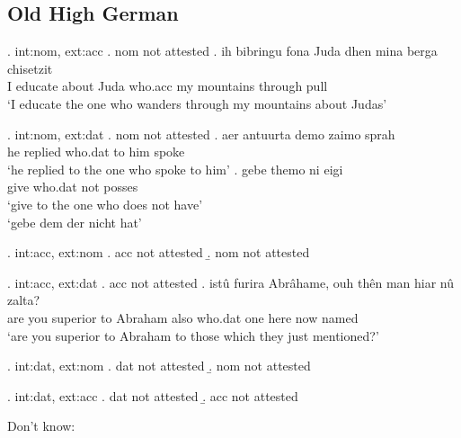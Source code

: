 \subsection{Old High German}


\ex. \ac{int}:\ac{nom}, \ac{ext}:\ac{acc}
\a. \ac{nom} not attested
\bg. ih bibringu fona Juda dhen mina berga chisetzit\\
 I educate\scsub{[acc]} about Juda who.\ac{acc} my mountains {through pull}\scsub{[nom]}\\
 `I educate the one who wanders through my mountains about Judas' 

\ex. \ac{int}:\ac{nom}, \ac{ext}:\ac{dat}
\a. \ac{nom} not attested
\bg. aer antuurta demo zaimo sprah\\
 he replied\scsub{[dat]} who.\ac{dat} {to him} spoke\scsub{[nom]}\\
 `he replied to the one who spoke to him' 
\bg. gebe themo ni eigi\\
 give\scsub{[dat]} who.\ac{dat} not posses\scsub{[nom]}\\
 `give to the one who does not have' \\
 `gebe dem der nicht hat' 

\ex. \ac{int}:\ac{acc}, \ac{ext}:\ac{nom}
\a. \ac{acc} not attested
\b. \ac{nom} not attested

\ex. \ac{int}:\ac{acc}, \ac{ext}:\ac{dat}
\a. \ac{acc} not attested
\bg. istû furira Abrâhame, ouh thên man hiar nû zalta?\\
 {are you} superior\scsub{[dat]} {to Abraham} also who.\ac{dat} one here now named\scsub{[acc]}\\
 `are you superior to Abraham to those which they just mentioned?' 

\ex. \ac{int}:\ac{dat}, \ac{ext}:\ac{nom}
\a. \ac{dat} not attested
\b. \ac{nom} not attested

\ex. \ac{int}:\ac{dat}, \ac{ext}:\ac{acc}
\a. \ac{dat} not attested
\b. \ac{acc} not attested





Don't know:

